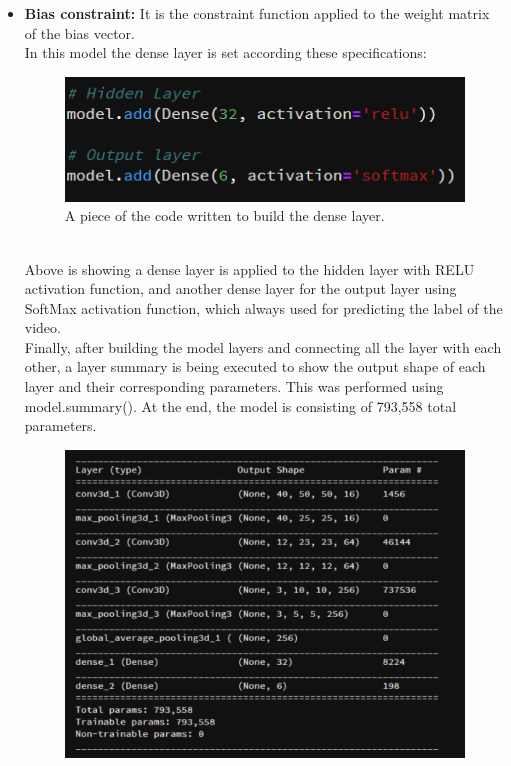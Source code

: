 \begin{itemize}
\begin{itemize}
    \item \textbf{Bias constraint:} It is the constraint function applied to the weight matrix of the bias vector.\hfill \\
    In this model the dense layer is set according these specifications:\hfill \\
    \begin{figure}[ht]
    \centering
    \includegraphics{Figures/dl}
    \decoRule
    \caption[A piece of the code written to build the dense layer.]{A piece of the code written to build the dense layer.}
    \label{fig:la}
    \end{figure}\hfill \\
    Above is showing a dense layer is applied to the hidden layer with RELU activation function, and another dense layer for the output layer using SoftMax activation function, which always used for predicting the label of the video.\\
    Finally, after building the model layers and connecting all the layer with each other, a layer summary is being executed to show the output shape of each layer and their corresponding parameters. This was performed using model.summary(). At the end, the model is consisting of 793,558 total parameters.
    \newpage
    \begin{figure}[ht]
    \centering
    \includegraphics{Figures/s}

\end{figure}
\end{itemize}
\end{itemize}
